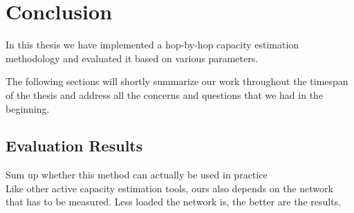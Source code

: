 \chapter{Conclusion}
In this thesis we have implemented a hop-by-hop capacity estimation methodology and evaluated it based on various parameters. 

The following sections will shortly summarize our work throughout the timespan of the thesis and address all the concerns and questions that we had in the beginning.

\section{Evaluation Results}
Sum up whether this method can actually be used in practice\\

Like other active capacity estimation tools, ours also depends on the network that has to be measured. 
Less loaded the network is, the better are the results.

